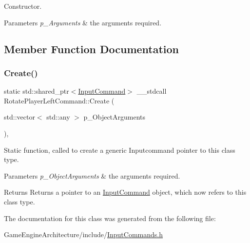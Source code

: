 Constructor. 


\begin{DoxyParams}{Parameters}
{\em p\+\_\+\+Arguments} & the arguments required. \\
\hline
\end{DoxyParams}


\subsection{Member Function Documentation}
\mbox{\label{class_rotate_player_left_command_aa41888f371f41c1687e7140d588f6a63}} 
\subsubsection{\texorpdfstring{Create()}{Create()}}
{\footnotesize\ttfamily static std\+::shared\+\_\+ptr$<$\mbox{\hyperlink{class_input_command}{Input\+Command}}$>$ \+\_\+\+\_\+stdcall Rotate\+Player\+Left\+Command\+::\+Create (\begin{DoxyParamCaption}\item[{std\+::vector$<$ std\+::any $>$}]{p\+\_\+\+Object\+Arguments }\end{DoxyParamCaption})\hspace{0.3cm}{\ttfamily [inline]}, {\ttfamily [static]}}



Static function, called to create a generic Inputcommand pointer to this class type. 


\begin{DoxyParams}{Parameters}
{\em p\+\_\+\+Object\+Arguments} & the arguments required. \\
\hline
\end{DoxyParams}
\begin{DoxyReturn}{Returns}
Returns a pointer to an \mbox{\hyperlink{class_input_command}{Input\+Command}} object, which now refers to this class type. 
\end{DoxyReturn}


The documentation for this class was generated from the following file\+:\begin{DoxyCompactItemize}
\item 
Game\+Engine\+Architecture/include/\mbox{\hyperlink{_input_commands_8h}{Input\+Commands.\+h}}\end{DoxyCompactItemize}
